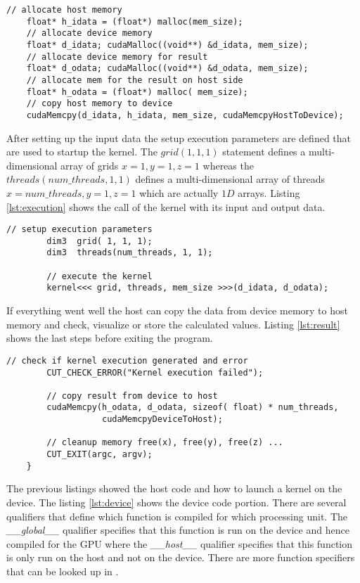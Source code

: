 \begin{lstlisting}[caption=Data transfer of data, label=lst:datatransfer]
	// allocate host memory 
	float* h_idata = (float*) malloc(mem_size);
	// allocate device memory 
	float* d_idata; cudaMalloc((void**) &d_idata, mem_size);
	// allocate device memory for result
	float* d_odata; cudaMalloc((void**) &d_odata, mem_size);
	// allocate mem for the result on host side
	float* h_odata = (float*) malloc( mem_size);
	// copy host memory to device 
	cudaMemcpy(d_idata, h_idata, mem_size, cudaMemcpyHostToDevice);
\end{lstlisting}


After setting up the input data the setup execution parameters are defined that
are used to startup the kernel. The $grid(1, 1, 1)$ statement defines a
multi-dimensional array of grids $x=1, y=1, z=1$ whereas the
$threads(num\_threads, 1, 1)$ defines a multi-dimensional array of threads
$x=num\_threads, y=1, z=1$ which are actually $1D$ arrays. Listing
\autoref{lst:execution} shows the call of the kernel with its input and output data.


\begin{lstlisting}[caption=Execution of the Kernel, label=lst:execution]
	    // setup execution parameters
	    dim3  grid( 1, 1, 1);
	    dim3  threads(num_threads, 1, 1);

	    // execute the kernel
	    kernel<<< grid, threads, mem_size >>>(d_idata, d_odata);

\end{lstlisting}



If everything went well the host can copy the data from device memory
to host memory and check, visualize or store the calculated values. Listing
\autoref{lst:result} shows the last steps before exiting the program.


\begin{lstlisting}[caption=Retrieving of the Results, label=lst:result]
	    // check if kernel execution generated and error
	    CUT_CHECK_ERROR("Kernel execution failed");
 
	    // copy result from device to host
	    cudaMemcpy(h_odata, d_odata, sizeof( float) * num_threads, 
			       cudaMemcpyDeviceToHost);

	    // cleanup memory free(x), free(y), free(z) ...
		CUT_EXIT(argc, argv);
	}
\end{lstlisting}



The previous listings showed the host code and how to launch a kernel on the
device. The listing \autoref{lst:device} shows the device code portion. There are
several qualifiers that define which function is compiled for which processing
unit. The \textit{\_\_global\_\_} qualifier specifies that this function is run
on the device and hence compiled for the \gls{GPU} where the \textit{\_\_host\_\_}
qualifier specifies that this function is only run on the host and not on the
device. There are more function specifiers that can be looked up in
\citep{citeulike:3325943}.

